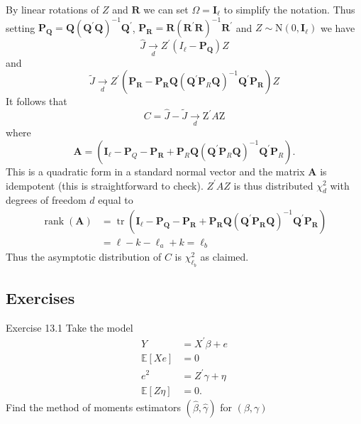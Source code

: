 \documentclass[10pt]{article}
\begin{document}
By linear rotations of $Z$ and $\boldsymbol{R}$ we can set $\Omega=\boldsymbol{I}_{\ell}$ to simplify the notation. Thus setting $\boldsymbol{P}_{\boldsymbol{Q}}=\boldsymbol{Q}\left(\boldsymbol{Q}^{\prime} \boldsymbol{Q}\right)^{-1} \boldsymbol{Q}^{\prime}$, $\boldsymbol{P}_{\boldsymbol{R}}=\boldsymbol{R}\left(\boldsymbol{R}^{\prime} \boldsymbol{R}\right)^{-1} \boldsymbol{R}^{\prime}$ and $Z \sim \mathrm{N}\left(0, \boldsymbol{I}_{\ell}\right)$ we have
$$
\widehat{J} \underset{d}{\longrightarrow} Z^{\prime}\left(I_{\ell}-\boldsymbol{P}_{\mathbf{Q}}\right) Z
$$
and
$$
\widetilde{J} \underset{d}{\rightarrow} Z^{\prime}\left(\boldsymbol{P}_{\boldsymbol{R}}-\boldsymbol{P}_{\boldsymbol{R}} \boldsymbol{Q}\left(\boldsymbol{Q}^{\prime} \boldsymbol{P}_{R} \boldsymbol{Q}\right)^{-1} \boldsymbol{Q}^{\prime} \boldsymbol{P}_{\boldsymbol{R}}\right) Z
$$
It follows that
$$
C=\widehat{J}-\widetilde{J} \underset{d}{\longrightarrow} \mathrm{Z}^{\prime} A \mathrm{Z}
$$
where
$$
\boldsymbol{A}=\left(\boldsymbol{I}_{\ell}-\boldsymbol{P}_{Q}-\boldsymbol{P}_{\boldsymbol{R}}+\boldsymbol{P}_{R} \boldsymbol{Q}\left(\boldsymbol{Q}^{\prime} \boldsymbol{P}_{R} \boldsymbol{Q}\right)^{-1} \boldsymbol{Q}^{\prime} \boldsymbol{P}_{R}\right) .
$$
This is a quadratic form in a standard normal vector and the matrix $\boldsymbol{A}$ is idempotent (this is straightforward to check). $Z^{\prime} A Z$ is thus distributed $\chi_{d}^{2}$ with degrees of freedom $d$ equal to
$$
\begin{aligned}
\operatorname{rank}(\boldsymbol{A}) &=\operatorname{tr}\left(\boldsymbol{I}_{\ell}-\boldsymbol{P}_{\boldsymbol{Q}}-\boldsymbol{P}_{\boldsymbol{R}}+\boldsymbol{P}_{\boldsymbol{R}} \boldsymbol{Q}\left(\boldsymbol{Q}^{\prime} \boldsymbol{P}_{\boldsymbol{R}} \boldsymbol{Q}\right)^{-1} \boldsymbol{Q}^{\prime} \boldsymbol{P}_{\boldsymbol{R}}\right) \\
&=\ell-k-\ell_{a}+k=\ell_{b}
\end{aligned}
$$
Thus the asymptotic distribution of $C$ is $\chi_{\ell_{b}}^{2}$ as claimed.

\subsection{Exercises}
Exercise 13.1 Take the model
$$
\begin{aligned}
Y &=X^{\prime} \beta+e \\
\mathbb{E}[X e] &=0 \\
e^{2} &=Z^{\prime} \gamma+\eta \\
\mathbb{E}[Z \eta] &=0 .
\end{aligned}
$$
Find the method of moments estimators $(\widehat{\beta}, \widehat{\gamma})$ for $(\beta, \gamma)$
\end{document}
